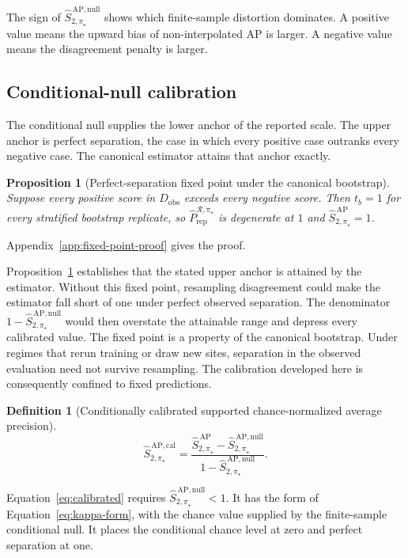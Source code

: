 \documentclass[11pt]{article}
\newcommand{\Regime}{\mathcal{R}}
\newcommand{\SAPHat}{\widehat S_{2,\pi_\star}^{\,\mathrm{AP}}}
\newcommand{\SAPnullHat}{\widehat S_{2,\pi_\star}^{\,\mathrm{AP,null}}}
\newcommand{\SAPcalHat}{\widehat S_{2,\pi_\star}^{\,\mathrm{AP,cal}}}
\newcommand{\PRepHat}{\widehat{P}_{\mathrm{rep}}^{\Regime,\pi_\star}}
\newtheorem{definition}{Definition}
\newtheorem{proposition}{Proposition}
\theoremstyle{remark}
\begin{document}
The sign of $\SAPnullHat$ shows which finite-sample distortion dominates. A positive value means the upward bias of non-interpolated AP is larger. A negative value means the disagreement penalty is larger.

\subsection{Conditional-null calibration}

The conditional null supplies the lower anchor of the reported scale. The upper anchor is perfect separation, the case in which every positive case outranks every negative case. The canonical estimator attains that anchor exactly.

\begin{proposition}[Perfect-separation fixed point under the canonical bootstrap]
\label{prop:fixed-point}
Suppose every positive score in $D_{\mathrm{obs}}$ exceeds every negative score. Then $t_b=1$ for every stratified bootstrap replicate, so $\PRepHat$ is degenerate at $1$ and $\SAPHat=1$.
\end{proposition}

Appendix~\ref{app:fixed-point-proof} gives the proof.

Proposition~\ref{prop:fixed-point} establishes that the stated upper anchor is attained by the estimator. Without this fixed point, resampling disagreement could make the estimator fall short of one under perfect observed separation. The denominator $1-\SAPnullHat$ would then overstate the attainable range and depress every calibrated value. The fixed point is a property of the canonical bootstrap. Under regimes that rerun training or draw new sites, separation in the observed evaluation need not survive resampling. The calibration developed here is consequently confined to fixed predictions.

\begin{definition}[Conditionally calibrated supported chance-normalized average precision]
\begin{equation}
\SAPcalHat
=
\frac{\SAPHat-\SAPnullHat}{1-\SAPnullHat}.
\label{eq:calibrated}
\end{equation}
\end{definition}

Equation~\eqref{eq:calibrated} requires $\SAPnullHat<1$. It has the form of Equation~\eqref{eq:kappa-form}, with the chance value supplied by the finite-sample conditional null. It places the conditional chance level at zero and perfect separation at one.
\end{document}
